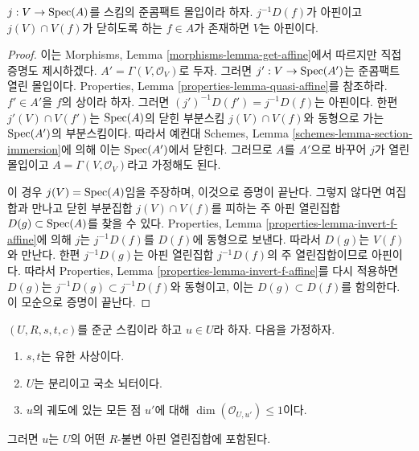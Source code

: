 \begin{lemma}
\label{lemma-get-affine}
$j : V \to \mathop{\mathrm{Spec}}(A)$를 스킴의 준콤팩트 몰입이라 하자.
$j^{-1}D(f)$가 아핀이고 $j(V) \cap V(f)$가 닫히도록 하는 $f \in A$가
존재하면 $V$는 아핀이다.
\end{lemma}

\begin{proof}
이는 Morphisms, Lemma \ref{morphisms-lemma-get-affine}에서 따르지만 직접
증명도 제시하겠다. $A' = \Gamma(V, \mathcal{O}_V)$로 두자. 그러면
$j' : V \to \mathop{\mathrm{Spec}}(A')$는 준콤팩트 열린 몰입이다. Properties, Lemma
\ref{properties-lemma-quasi-affine}를 참조하라. $f' \in A'$을 $f$의 상이라 하자.
그러면 $(j')^{-1}D(f') = j^{-1}D(f)$는 아핀이다. 한편
$j'(V) \cap V(f')$는 $\mathop{\mathrm{Spec}}(A)$의 닫힌 부분스킴
$j(V) \cap V(f)$와 동형으로 가는
$\mathop{\mathrm{Spec}}(A')$의 부분스킴이다. 따라서 예컨대 Schemes, Lemma
\ref{schemes-lemma-section-immersion}에 의해 이는 $\mathop{\mathrm{Spec}}(A')$에서 닫힌다.
그러므로 $A$를 $A'$으로 바꾸어 $j$가 열린 몰입이고
$A = \Gamma(V, \mathcal{O}_V)$라고 가정해도 된다.

\medskip\noindent
이 경우 $j(V) = \mathop{\mathrm{Spec}}(A)$임을 주장하며, 이것으로 증명이 끝난다.
그렇지 않다면 여집합과 만나고 닫힌 부분집합 $j(V) \cap V(f)$를 피하는
주 아핀 열린집합 $D(g) \subset \mathop{\mathrm{Spec}}(A)$를 찾을 수 있다. Properties, Lemma
\ref{properties-lemma-invert-f-affine}에 의해 $j$는 $j^{-1}D(f)$를 $D(f)$에
동형으로 보낸다. 따라서 $D(g)$는 $V(f)$와 만난다. 한편
$j^{-1}D(g)$는 아핀 열린집합 $j^{-1}D(f)$의 주 열린집합이므로 아핀이다.
따라서 Properties, Lemma \ref{properties-lemma-invert-f-affine}를 다시
적용하면 $D(g)$는 $j^{-1}D(g) \subset j^{-1}D(f)$와 동형이고, 이는
$D(g) \subset D(f)$를 함의한다. 이 모순으로 증명이 끝난다.
\end{proof}

\begin{lemma}
\label{lemma-find-affine-codimension-1}
$(U, R, s, t, c)$를 준군 스킴이라 하고 $u \in U$라 하자. 다음을 가정하자.
\begin{enumerate}
\item $s, t$는 유한 사상이다.
\item $U$는 분리이고 국소 뇌터이다.
\item $u$의 궤도에 있는 모든 점 $u'$에 대해
$\dim(\mathcal{O}_{U, u'}) \leq 1$이다.
\end{enumerate}
그러면 $u$는 $U$의 어떤 $R$-불변 아핀 열린집합에 포함된다.
\end{lemma}

